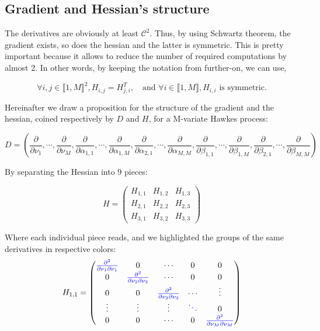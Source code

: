 \documentclass[11pt]{book}
\begin{document}
\subsection{Gradient and Hessian's structure}
The derivatives are obviously at least $\mathcal C^2$. Thus, by using Schwartz theorem, the gradient exists, so does the hessian and the latter is symmetric. This is pretty important because it allows to reduce the number of required computations by almost $2$. In other words, by keeping the notation from further-on, we can use, 

$$\forall i,j \in  \llbracket 1, M \rrbracket ^ 2,  H_{i,j} = H_{j,i}^T, \quad \text{and  } \forall i \in  \llbracket 1, M \rrbracket, H_{i,i} \text{ is symmetric.} $$


Hereinafter we draw a proposition for the structure of the gradient and the hessian, coined respectively by $D$ and $H$, for a M-variate Hawkes process:

\begin{equation}
D = \left ( 
\frac{\partial } {\partial \nu_1}, \cdots, \frac{\partial } {\partial \nu_M}
, 
\frac{\partial } {\partial \alpha_{1,1}},  \cdots, 
\frac{\partial } {\partial \alpha_{1,M}}, 
\frac{\partial } {\partial  \alpha_{2,1}}, \cdots, 
\frac{\partial } {\partial  \alpha_{M,M}}, 
\frac{\partial } {\partial  \beta_{1,1}}, \cdots, 
\frac{\partial } {\partial  \beta_{1,M}}, 
\frac{\partial } {\partial \beta_{2,1}}, \cdots, 
\frac{\partial } {\partial  \beta_{M,M}}  \right ) 
\end{equation}

By separating the Hessian into 9 pieces:

\begin{equation}
H = 
\begin{pmatrix}
H_{1,1} & H_{1,2}    & H_{1,3}  \\
H_{2,1}   &  H_{2,2}   & H_{2,3}\\
H_{3,1}      & H_{3,2}       &  H_{3,3}
\end{pmatrix}
\end{equation}

Where each individual piece reads, and we highlighted the groups of the same derivatives in respective colors:
\begin{equation}
H_{1,1} = 
\begin{pmatrix}
\textcolor{blue}{\frac{\partial^2 } {\partial \nu_1 \partial \nu_1 }} & 0       & \cdots & 0 & 0       \\
0      & \textcolor{blue}{\frac{\partial^2 } {\partial \nu_2 \partial \nu_2 }}
  & \cdots      &  0 & 0       \\
0      & 0       &  \textcolor{blue}{\frac{\partial^2 } {\partial \nu_3 \partial \nu_3 }}
     & \cdots & \vdots  \\
\vdots & \vdots  & \vdots & \textcolor{blue}{\ddots} & 0       \\
0      & 0       & \cdots & 0      & \textcolor{blue}{\frac{\partial^2 } {\partial \nu_M \partial \nu_M }}
\end{pmatrix}
\end{equation}
\end{document}
